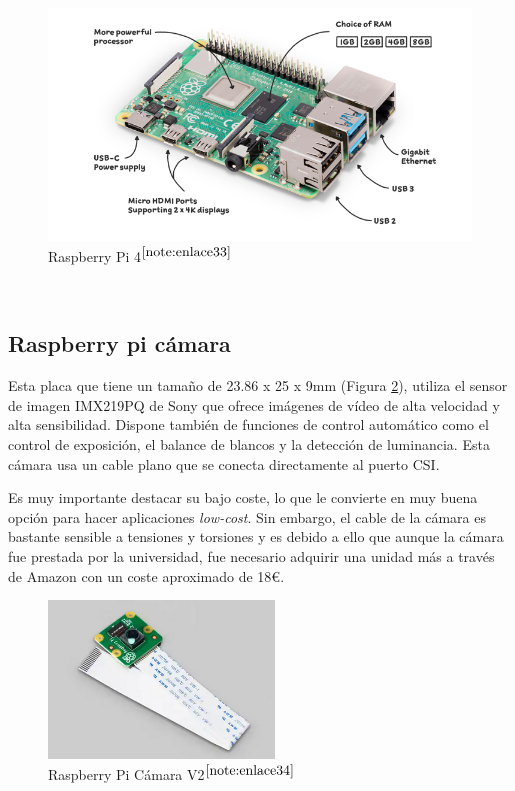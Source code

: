 \begin{figure} [h!]
	\begin{center}
		\includegraphics[width=14cm]{figs/raspberrypi4.png}
	\end{center}
	\caption{Raspberry Pi 4$^{\ref{note:enlace33}}$} 
\label{fig:raspberry}
\end{figure}\

\setcounter{footnote}{33} %

\subsection{Raspberry pi cámara}

Esta placa que tiene un tamaño de  23.86 x 25 x 9mm (Figura \ref{fig:raspberrycam}), utiliza el sensor de imagen IMX219PQ de Sony que ofrece imágenes de vídeo de alta velocidad y alta sensibilidad. Dispone también de funciones de control automático como el control de exposición, el balance de blancos y la detección de luminancia. Esta cámara usa un cable plano que se conecta directamente al puerto \ac{CSI}.

Es muy importante destacar su bajo coste, lo que le convierte en muy buena opción para hacer aplicaciones \textit{low-cost}. Sin embargo, el cable de la cámara es bastante sensible a tensiones y torsiones y es debido a ello que aunque la cámara fue prestada por la universidad, fue necesario adquirir una unidad más a través de Amazon con un coste aproximado de 18€.    


\begin{figure} [h!]
	\begin{center}
		\includegraphics[width=6cm]{figs/campi.png}
	\end{center}
	\caption{Raspberry Pi Cámara V2$^{\ref{note:enlace34}}$} 
\label{fig:raspberrycam}
\end{figure}\

